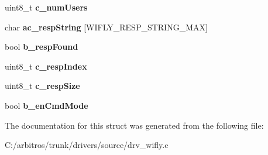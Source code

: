 \begin{DoxyCompactItemize}
\item 
\hypertarget{structt__wifly_dev_a65907c8d88006e5cdc5e6b18eb4606ba}{uint8\-\_\-t {\bfseries c\-\_\-num\-Users}}\label{structt__wifly_dev_a65907c8d88006e5cdc5e6b18eb4606ba}

\item 
\hypertarget{structt__wifly_dev_a0b51c631197135a507a5abd137383d4a}{char {\bfseries ac\-\_\-resp\-String} \mbox{[}W\-I\-F\-L\-Y\-\_\-\-R\-E\-S\-P\-\_\-\-S\-T\-R\-I\-N\-G\-\_\-\-M\-A\-X\mbox{]}}\label{structt__wifly_dev_a0b51c631197135a507a5abd137383d4a}

\item 
\hypertarget{structt__wifly_dev_a67d4acf8638670a28ae524090d49b329}{bool {\bfseries b\-\_\-resp\-Found}}\label{structt__wifly_dev_a67d4acf8638670a28ae524090d49b329}

\item 
\hypertarget{structt__wifly_dev_af6a614134aef34fac3fe5443afd500db}{uint8\-\_\-t {\bfseries c\-\_\-resp\-Index}}\label{structt__wifly_dev_af6a614134aef34fac3fe5443afd500db}

\item 
\hypertarget{structt__wifly_dev_ad289c48cfd3544bbdee95fbb455dc31c}{uint8\-\_\-t {\bfseries c\-\_\-resp\-Size}}\label{structt__wifly_dev_ad289c48cfd3544bbdee95fbb455dc31c}

\item 
\hypertarget{structt__wifly_dev_aa5136dfc90760dc7622c6855813d60e5}{bool {\bfseries b\-\_\-en\-Cmd\-Mode}}\label{structt__wifly_dev_aa5136dfc90760dc7622c6855813d60e5}

\end{DoxyCompactItemize}


The documentation for this struct was generated from the following file\-:\begin{DoxyCompactItemize}
\item 
C\-:/arbitros/trunk/drivers/source/drv\-\_\-wifly.\-c\end{DoxyCompactItemize}
